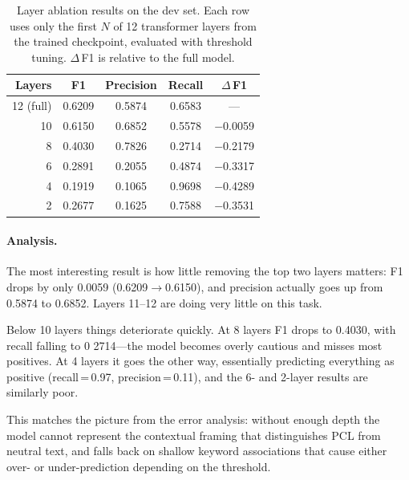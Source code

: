 \documentclass[11pt,a4paper]{article}
\begin{document}
\begin{table}
    \centering
    \caption{Layer ablation results on the dev set. Each row uses only the first $N$ of 12 transformer layers from the trained checkpoint, evaluated with threshold tuning. $\Delta$\,F1 is relative to the full model.}
    \label{tab:ablation}
    \begin{tabular}{rcccc}
        \toprule
        \textbf{Layers} & \textbf{F1} & \textbf{Precision} & \textbf{Recall} & \textbf{$\Delta$\,F1} \\
        \midrule
        12 (full) & 0.6209 & 0.5874 & 0.6583 & --- \\
        10        & 0.6150 & 0.6852 & 0.5578 & $-$0.0059 \\
        8         & 0.4030 & 0.7826 & 0.2714 & $-$0.2179 \\
        6         & 0.2891 & 0.2055 & 0.4874 & $-$0.3317 \\
        4         & 0.1919 & 0.1065 & 0.9698 & $-$0.4289 \\
        2         & 0.2677 & 0.1625 & 0.7588 & $-$0.3531 \\
        \bottomrule
    \end{tabular}
\end{table}

\paragraph{Analysis.} The most interesting result is how little removing the top two layers matters: F1 drops by only 0.0059 (0.6209$\to$0.6150), and precision actually goes up from 0.5874 to 0.6852. Layers 11--12 are doing very little on this task.

Below 10 layers things deteriorate quickly. At 8 layers F1 drops to 0.4030, with recall falling to 0 2714---the model becomes overly cautious and misses most positives. At 4 layers it goes the other way, essentially predicting everything as positive (recall\,=\,0.97, precision\,=\,0.11), and the 6- and 2-layer results are similarly poor.

This matches the picture from the error analysis: without enough depth the model cannot represent the contextual framing that distinguishes PCL from neutral text, and falls back on shallow keyword associations that cause either over- or under-prediction depending on the threshold.



\end{document}
